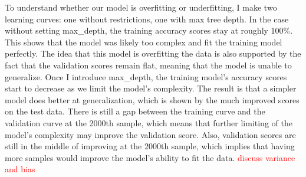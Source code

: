 \documentclass{article}
\newcommand\todo[1]{\textcolor{red}{#1}}
\begin{document}
To understand whether our model is overfitting or underfitting, I make two learning curves: one without restrictions, one with max tree depth. In the case without setting max\_depth, the training accuracy scores stay at roughly 100\%. This shows that the model was likely too complex and fit the training model perfectly. The idea that this model is overfitting the data is also supported by the fact that the validation scores remain flat, meaning that the model is unable to generalize. Once I introduce max\_depth, the training model's accuracy scores start to decrease as we limit the model's complexity. The result is that a simpler model does better at generalization, which is shown by the much improved scores on the test data. There is still a gap between the training curve and the validation curve at the 2000th sample, which means that further limiting of the model's complexity may improve the validation score. Also, validation scores are still in the middle of improving at the 2000th sample, which implies that having more samples would improve the model's ability to fit the data. \todo{discuss variance and bias}
\end{document}
